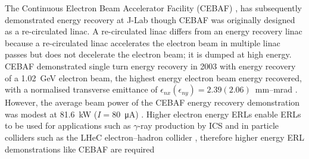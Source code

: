 \documentclass[../main.tex]{subfiles}
\begin{document}
The Continuous Electron Beam Accelerator Facility (CEBAF) \cite{bogacz2003cebaf,tennant2003beam}, has subsequently demonstrated energy recovery at J-Lab though CEBAF was originally designed as a re-circulated linac. A re-circulated linac differs from an energy recovery linac because a re-circulated linac accelerates the electron beam in multiple linac passes but does not decelerate the electron beam; it is dumped at high energy. CEBAF demonstrated single turn energy recovery in 2003 \cite{bogacz2003cebaf,tennant2003beam} with energy recovery of a 1.02~\si{\giga\electronvolt} electron beam, the highest energy electron beam energy recovered, with a normalised transverse emittance of $\epsilon_{nx} \left(\epsilon_{ny}\right) = 2.39 \left(2.06\right)$~\si{\milli\meter}--\si{\milli\radian} \cite{tennant2003beam}. However, the average beam power of the CEBAF energy recovery demonstration was modest at 81.6~\si{\kilo\watt} ($I = 80$~\si{\micro\ampere}) \cite{freyberger2004cebaf}. Higher electron energy ERLs enable ERLs to be used for applications such as $\gamma$-ray production by ICS \cite{budker2021expanding} and in particle colliders such as the LHeC electron--hadron collider \cite{agostini2021large}, therefore higher energy ERL demonstrations like CEBAF are required   
\end{document}
